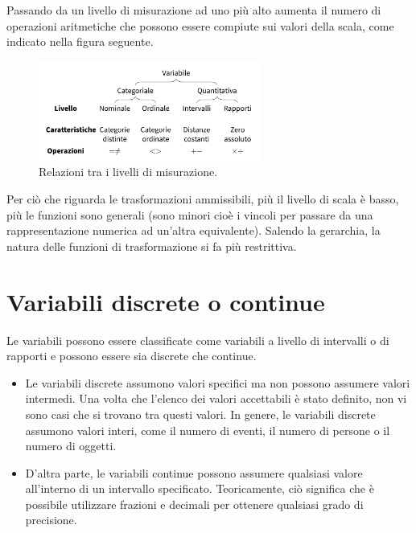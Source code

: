 \documentclass[
  letterpaper,
  krantz2]{{[}./krantz{]}}
\providecommand{\tightlist}{%
  \setlength{\itemsep}{0pt}\setlength{\parskip}{0pt}}\usepackage{longtable,booktabs,array}
\begin{document}
Passando da un livello di misurazione ad uno più alto aumenta il numero
di operazioni aritmetiche che possono essere compiute sui valori della
scala, come indicato nella figura seguente.

\begin{figure}[H]

{\centering \includegraphics[width=0.65\textwidth,height=\textheight]{chapters/key_notions/../../figures/misurazione_1.png}

}

\caption{Relazioni tra i livelli di misurazione.}

\end{figure}%

Per ciò che riguarda le trasformazioni ammissibili, più il livello di
scala è basso, più le funzioni sono generali (sono minori cioè i vincoli
per passare da una rappresentazione numerica ad un'altra equivalente).
Salendo la gerarchia, la natura delle funzioni di trasformazione si fa
più restrittiva.

\section{Variabili discrete o
continue}\label{variabili-discrete-o-continue}

Le variabili possono essere classificate come variabili a livello di
intervalli o di rapporti e possono essere sia discrete che continue.

\begin{itemize}
\tightlist
\item
  Le variabili discrete assumono valori specifici ma non possono
  assumere valori intermedi. Una volta che l'elenco dei valori
  accettabili è stato definito, non vi sono casi che si trovano tra
  questi valori. In genere, le variabili discrete assumono valori
  interi, come il numero di eventi, il numero di persone o il numero di
  oggetti.
\item
  D'altra parte, le variabili continue possono assumere qualsiasi valore
  all'interno di un intervallo specificato. Teoricamente, ciò significa
  che è possibile utilizzare frazioni e decimali per ottenere qualsiasi
  grado di precisione.
\end{itemize}
\end{document}
